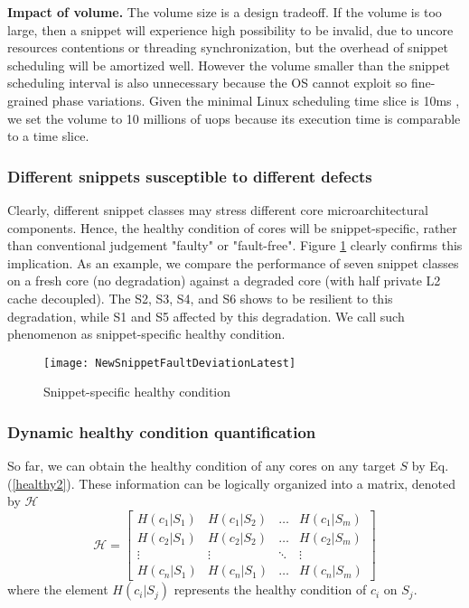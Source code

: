 \textbf{Impact of volume.}
The volume size is a design tradeoff. If the volume is too large, then a snippet will experience high possibility to be invalid, due to uncore resources contentions or threading synchronization, but the overhead of snippet scheduling will be amortized well. However the volume smaller than the snippet scheduling interval is also unnecessary because the OS cannot exploit so fine-grained phase variations. Given the minimal Linux  scheduling time slice is 10ms \cite{PIE}, we set the volume to 10 millions of uops because its execution time is comparable to a time slice.


\subsubsection{Different snippets susceptible to different defects }
Clearly, different snippet classes may stress different core microarchitectural components. Hence, the healthy condition of cores will be snippet-specific, rather than conventional judgement "faulty" or "fault-free". Figure \ref{faultaware} clearly confirms this implication. As an example, we compare the performance of seven snippet classes on a fresh core (no degradation) against a degraded core (with half private L2 cache decoupled). The S2, S3, S4, and S6 shows to be resilient to this degradation, while S1 and S5 affected by this degradation. We call such phenomenon as snippet-specific healthy condition.

\begin{figure}[t]
  \centering
  \texttt{[image: NewSnippetFaultDeviationLatest]}\\
  \caption{Snippet-specific healthy condition}\label{faultaware}
\end{figure}


\subsubsection{Dynamic healthy condition quantification}
So far, we can obtain the healthy condition of any cores on any target $S$ by Eq. (\ref{healthy2}). These information can be logically organized into a matrix, denoted by $\mathcal{H}$
\begin{equation}
\mathcal{H}=\left[
\begin{array}{cccc}
H(c_1|S_1) & H(c_1|S_2) & \ldots & H(c_1|S_m)\\
H(c_2|S_1) & H(c_2|S_2) & \ldots & H(c_2|S_m)\\
\vdots & \vdots & \ddots & \vdots\\
H(c_n|S_1) & H(c_n|S_1) & \ldots & H(c_n|S_m)
\end{array} \right]
\end{equation}
where the element $H(c_i|S_j)$ represents the healthy condition of $c_i$ on $S_j$.

